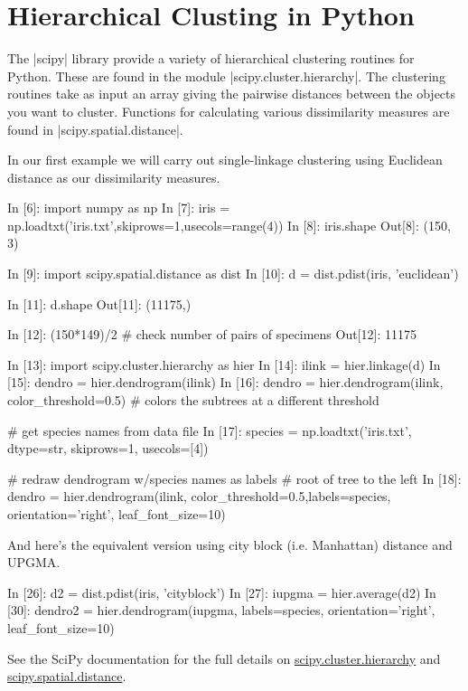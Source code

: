 \section{Hierarchical Clusting in Python}

The |scipy| library provide a variety of hierarchical clustering routines for Python.  These are found in the module |scipy.cluster.hierarchy|.  The clustering routines take as input an array giving the pairwise distances between the objects you want to cluster.  Functions for calculating various dissimilarity measures are found in |scipy.spatial.distance|.  

In our first example we will carry out single-linkage clustering using Euclidean distance as our dissimilarity measures.

\begin{python}
In [6]: import numpy as np
In [7]: iris = np.loadtxt('iris.txt',skiprows=1,usecols=range(4))
In [8]: iris.shape
Out[8]: (150, 3)

In [9]: import scipy.spatial.distance as dist
In [10]: d = dist.pdist(iris, 'euclidean')

In [11]: d.shape
Out[11]: (11175,)

In [12]: (150*149)/2  # check number of pairs of specimens
Out[12]: 11175

In [13]: import scipy.cluster.hierarchy as hier
In [14]: ilink = hier.linkage(d)
In [15]: dendro = hier.dendrogram(ilink)
In [16]: dendro = hier.dendrogram(ilink, color_threshold=0.5) # colors the subtrees at a different threshold

# get species names from data file
In [17]: species = np.loadtxt('iris.txt', dtype=str, skiprows=1, usecols=[4]) 

# redraw dendrogram w/species names as labels
# root of tree to the left
In [18]: dendro = hier.dendrogram(ilink, color_threshold=0.5,labels=species, orientation='right', leaf_font_size=10)
\end{python}

And here's the equivalent version using city block (i.e. Manhattan) distance and UPGMA.

\begin{python}
In [26]: d2 = dist.pdist(iris, 'cityblock')
In [27]: iupgma = hier.average(d2)
In [30]: dendro2 = hier.dendrogram(iupgma, labels=species, orientation='right', leaf_font_size=10)
\end{python}

See the SciPy documentation for the full details on \href{http://docs.scipy.org/doc/scipy/reference/cluster.hierarchy.html}{scipy.cluster.hierarchy} and \\
\href{http://docs.scipy.org/doc/scipy/reference/spatial.distance.html}{scipy.spatial.distance}.


